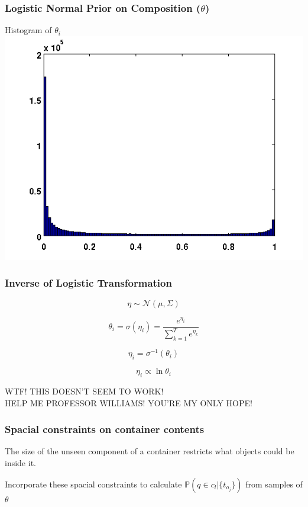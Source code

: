 \begin{frame}
  \frametitle{Logistic Normal Prior on Composition ($\theta$)}
  \begin{center}
    Histogram of $\theta_i$
    \includegraphics[scale=0.6]{img/log-normal-figs/hist-2.png}
  \end{center}
\end{frame}

\begin{frame}
  \frametitle{Inverse of Logistic Transformation}
  \begin{center}
    \begin{equation*}
      \eta \sim \mathcal{N}(\mu, \Sigma)
    \end{equation*}

    \begin{equation*}
      \theta_i = \sigma(\eta_i) = \frac{e^{\eta_i}}{\sum_{k=1}^{T}e^{\eta_k}}
    \end{equation*}

    \begin{equation*}
      \eta_i = \sigma^{-1}(\theta_i)
    \end{equation*}

    \begin{equation*}
      \eta_i \propto \ln \theta_i
    \end{equation*}

    WTF! THIS DOESN'T SEEM TO WORK! \\
    HELP ME PROFESSOR WILLIAMS! YOU'RE MY ONLY HOPE!
  \end{center}
\end{frame}

\begin{frame}
\frametitle{Spacial constraints on container contents}
\begin{center}
The size of the unseen component of a container restricts what objects could be
inside it.
\vspace{3em}

Incorporate these spacial constraints to calculate 
$\mathbb{P}(q \in c_l|\{t_{o_j}\})$
from samples of $\theta$
\end{center}
\end{frame}

